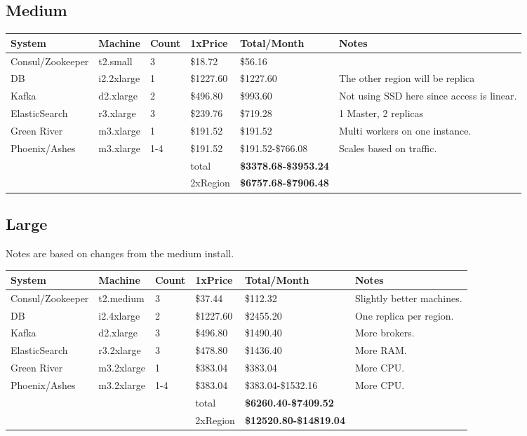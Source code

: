 \documentclass[11pt]{article}
\begin{document}
\subsection{Medium}
\begin{center}
    \begin{tabular}{| l l l l | l | p{3cm} |}
        \hline
        System & Machine & Count & 1xPrice & Total/Month & Notes \\
        \hline \hline
        Consul/Zookeeper & t2.small & 3 & \$18.72 & \$56.16 & \\ \hline
        DB & i2.2xlarge & 1 & \$1227.60 & \$1227.60 & The other region will be replica \\ \hline
        Kafka & d2.xlarge & 2 & \$496.80 & \$993.60 & Not using SSD here since access is linear.\\ \hline
        ElasticSearch & r3.xlarge & 3 & \$239.76 & \$719.28 & 1 Master, 2 replicas\\ \hline
        Green River & m3.xlarge & 1 & \$191.52 & \$191.52 & Multi workers on one instance.\\ \hline
        Phoenix/Ashes & m3.xlarge & 1-4 & \$191.52 & \$191.52-\$766.08 & Scales based on traffic.\\ \hline
        & & & total & {\bf \$3378.68-\$3953.24} & \\ \hline
        & & & 2xRegion & {\bf \$6757.68-\$7906.48} & \\ \hline
    \end{tabular}
\end{center}

\subsection{Large}

Notes are based on changes from the medium install.

\begin{center}
    \begin{tabular}{| l l l l | l | p{3cm} |}
        \hline
        System & Machine & Count & 1xPrice & Total/Month & Notes \\
        \hline \hline
        Consul/Zookeeper & t2.medium & 3 & \$37.44 & \$112.32 & Slightly better machines.\\ \hline
        DB & i2.4xlarge & 2 & \$1227.60 & \$2455.20 & One replica per region.\\ \hline
        Kafka & d2.xlarge & 3 & \$496.80 & \$1490.40 & More brokers.\\ \hline
        ElasticSearch & r3.2xlarge & 3 & \$478.80 & \$1436.40 & More RAM.\\ \hline
        Green River & m3.2xlarge & 1 & \$383.04 & \$383.04 & More CPU.\\ \hline
        Phoenix/Ashes & m3.2xlarge & 1-4 & \$383.04 & \$383.04-\$1532.16 & More CPU.\\ \hline
        & & & total & {\bf \$6260.40-\$7409.52} & \\ \hline
        & & & 2xRegion & {\bf \$12520.80-\$14819.04} & \\ \hline
    \end{tabular}
\end{center}
\end{document}
